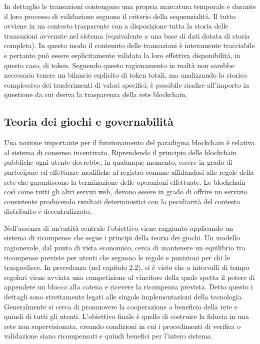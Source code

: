 In dettaglio le transazioni contengono una propria marcatura temporale e durante il loro processo di validazione seguono il criterio della sequenzialità. Il tutto avviene in un contesto trasparente con a disposizione tutta la storia delle transazioni avvenute nel sistema (equivalente a una base di dati dotata di storia completa). In questo modo il contenuto delle transazioni è interamente tracciabile e pertanto può essere esplicitamente validata la loro effettiva disponibilità, in questo caso, di token. Seguendo questo ragionamento in realtà non sarebbe necessario tenere un bilancio esplicito di token totali, ma analizzando lo storico complessivo dei trasferimenti di valori specifici, è possibile risalire all’importo in questione da cui deriva la trasparenza della rete blockchain.

\subsection{Teoria dei giochi e governabilità}

Una nozione importante per il funzionamento del paradigma blockchain è relativa al sistema di consenso incentivato. Riprendendo il principio delle blockchain pubbliche ogni utente dovrebbe, in qualunque momento, essere in grado di partecipare ed effettuare modifiche al registro comune affidandosi alle regole della rete che garantiscono la terminazione delle operazioni effettuate. Le blockchain così come tutti gli altri servizi web, devono essere in grado di offrire un servizio consistente producendo risultati deterministici con la peculiarità del contesto distribuito e decentralizzato.

Nell’assenza di un’entità centrale l’obiettivo viene raggiunto applicando un sistema di ricompense che segue i principi della teoria dei giochi. Un modello ragionevole, dal punto di vista economico, cerca di mantenere un equilibrio tra ricompense previste per utenti che seguono le regole e punizioni per chi le trasgredisce. In precedenza (nel capitolo 2.2), si è visto che a intervalli di tempo regolari viene avviata una competizione al vincitore della quale spetta il potere di appendere un blocco alla catena e ricevere la ricompensa prevista. Detto questo i dettagli sono strettamente legati alle singole implementazioni della tecnologia. Generalmente si cerca di promuovere la cooperazione a beneficio della rete e quindi di tutti gli utenti. L'obiettivo finale è quello di costruire la fiducia in una rete non supervisionata, creando condizioni in cui i procedimenti di verifica o validazione siano ricompensati e quindi benefici per l’intero sistema.

